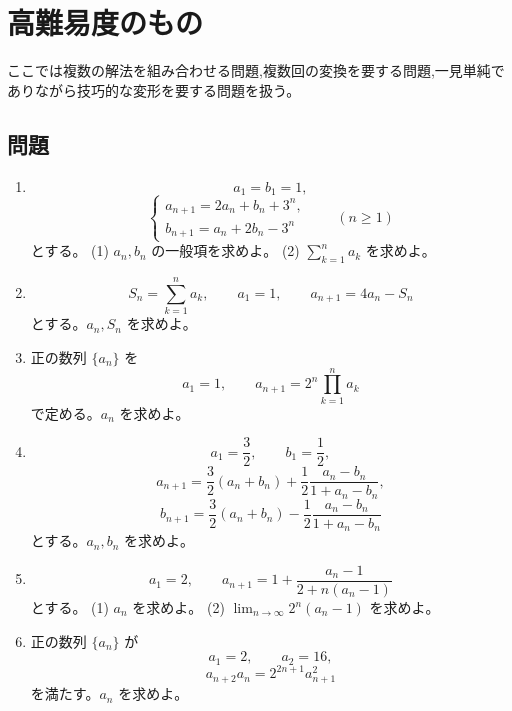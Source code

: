   \section{高難易度のもの}\label{節：高難易度のもの}
    ここでは複数の解法を組み合わせる問題,複数回の変換を要する問題,一見単純でありながら技巧的な変形を要する問題を扱う。

    \subsection{問題}\label{節：高難易度のもの：問題}
      \begin{enumerate}[label=\textbf{問\arabic*.},leftmargin=3.8em,format=\bookitemlink{practice-advanced}{problem}{answer}]
        \item \[
            a_1=b_1=1,
          \]
          \[
            \begin{cases}
              a_{n+1}=2a_n+b_n+3^n,\\
              b_{n+1}=a_n+2b_n-3^n
            \end{cases}
            \qquad(n\ge1)
          \]
              とする。
              (1) \(a_n,b_n\) の一般項を求めよ。
              (2) \(\displaystyle\sum_{k=1}^{n}a_k\) を求めよ。
        \item \[
            S_n=\sum_{k=1}^{n}a_k,\qquad
            a_1=1,\qquad
            a_{n+1}=4a_n-S_n
          \]
              とする。\(a_n,S_n\) を求めよ。
        \item 正の数列 \(\{a_n\}\) を
          \[
            a_1=1,\qquad
            a_{n+1}=2^n\prod_{k=1}^{n}a_k
          \]
              で定める。\(a_n\) を求めよ。
        \item \[
            a_1=\frac32,\qquad b_1=\frac12,
          \]
          \[
            a_{n+1}=
            \frac32(a_n+b_n)+
            \frac12\frac{a_n-b_n}{1+a_n-b_n},
          \]
          \[
            b_{n+1}=
            \frac32(a_n+b_n)-
            \frac12\frac{a_n-b_n}{1+a_n-b_n}
          \]
              とする。\(a_n,b_n\) を求めよ。
        \item \[
            a_1=2,\qquad
            a_{n+1}=1+\frac{a_n-1}{2+n(a_n-1)}
          \]
              とする。
              (1) \(a_n\) を求めよ。
              (2) \(\displaystyle\lim_{n\to\infty}2^n(a_n-1)\) を求めよ。
        \item 正の数列 \(\{a_n\}\) が
          \[
            a_1=2,\qquad a_2=16,
          \]
          \[
            a_{n+2}a_n=2^{2n+1}a_{n+1}^2
          \]
              を満たす。\(a_n\) を求めよ。

\end{enumerate}
